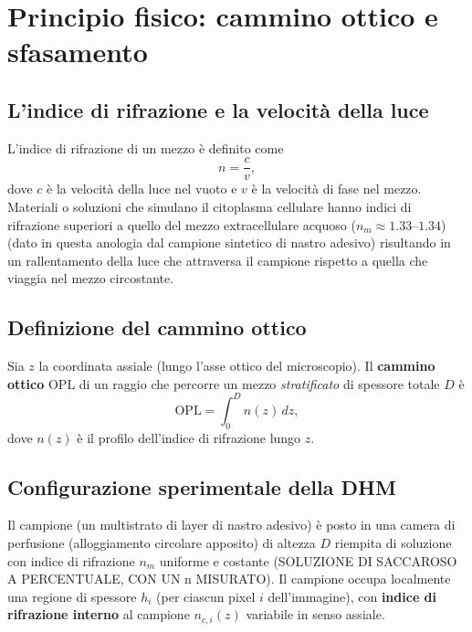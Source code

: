 \section{Principio fisico: cammino ottico e sfasamento}

\subsection{L'indice di rifrazione e la velocità della luce}

L'indice di rifrazione di un mezzo è definito come
\[
  n = \frac{c}{v},
\]
dove $c$ è la velocità della luce nel vuoto e $v$ è la velocità di fase nel mezzo.
Materiali o soluzioni che simulano il citoplasma cellulare hanno indici di rifrazione
superiori a quello del mezzo extracellulare acquoso ($n_m \approx 1.33$--$1.34$) (dato in questa anologia dal campione sintetico di nastro adesivo)
risultando in un rallentamento della luce che attraversa il campione rispetto a quella
che viaggia nel mezzo circostante.

\subsection{Definizione del cammino ottico}

Sia $z$ la coordinata assiale (lungo l'asse ottico del microscopio). Il
\textbf{cammino ottico} $\mathrm{OPL}$ di un raggio che percorre un mezzo
\textit{stratificato} di spessore totale $D$ è
\[
  \mathrm{OPL} = \int_0^D n(z)\,dz,
\]
dove $n(z)$ è il profilo dell'indice di rifrazione lungo $z$.

\subsection{Configurazione sperimentale della DHM}

Il campione (un multistrato di layer di nastro adesivo) è posto in una camera di perfusione (alloggiamento circolare apposito) di
altezza $D$ riempita di soluzione con indice di rifrazione $n_m$ uniforme e costante (SOLUZIONE DI SACCAROSO A PERCENTUALE, CON UN n MISURATO).
Il campione occupa localmente una regione di spessore $h_i$ (per ciascun pixel $i$
dell'immagine), con \textbf{indice di rifrazione interno} al campione $n_{c,i}(z)$ variabile in senso
assiale.

